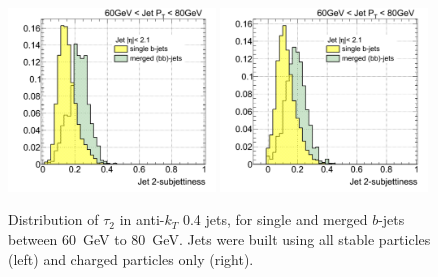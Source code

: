 \begin{figure}[tp]
\centering
\includegraphics[width=0.49\textwidth]{FIGS/TEMPFigs/PythisStandalone/Antikt4/allparticles/Tau2060.pdf}
\includegraphics[width=0.49\textwidth]{FIGS/TEMPFigs/PythisStandalone/Antikt4/chargedparticles/Tau2060.pdf}
\caption{Distribution of $\tau_2$ in anti-$k_T$ 0.4 jets, for single and merged $b$-jets between 60~GeV to 80~GeV. Jets were built using all stable particles (left) and charged particles only (right).}
\label{fig:pythiaTau2AllandCharged}
\end{figure}


